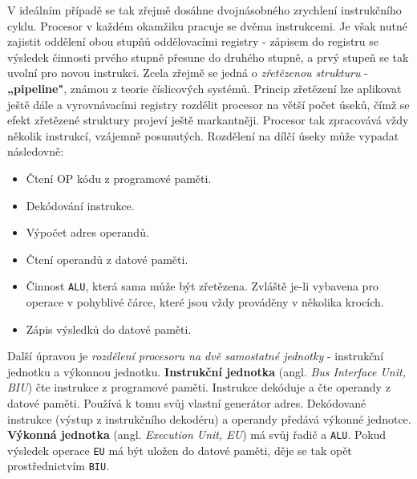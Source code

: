 
      V ideálním případě se tak zřejmě dosáhne dvojnásobného zrychlení instrukčního cyklu. Procesor 
      v každém okamžiku pracuje se dvěma instrukcemi. Je však nutné zajistit oddělení obou stupňů 
      oddělovacími registry - zápisem do registru se výsledek činnosti prvého stupně přesune do 
      druhého stupně, a prvý stupeň se tak uvolní pro novou instrukci. Zcela zřejmě se jedná o 
      \emph{zřetězenou strukturu} - \textbf{„pipeline"}, známou z teorie číslicových systémů. 
      Princip zřetězení lze aplikovat ještě dále a vyrovnávacími registry rozdělit procesor na 
      větší počet úseků, čímž se efekt zřetězené struktury projeví ještě markantněji. Procesor tak 
      zpracovává vždy několik instrukcí, vzájemně posunutých. Rozdělení na dílčí úseky může vypadat 
      následovně:
      \begin{itemize}[noitemsep]
        \item Čtení OP kódu z programové paměti.
        \item Dekódování instrukce.
        \item Výpočet adres operandů.
        \item Čtení operandů z datové paměti.
        \item Činnost \texttt{ALU}, která sama může být zřetězena. Zvláště je-li vybavena pro  
              operace v pohyblivé čárce, které jsou vždy prováděny v několika krocích.
        \item Zápis výsledků do datové paměti.
      \end{itemize}
      
      Další úpravou je \emph{rozdělení procesoru na dvě samostatné jednotky} - instrukční jednotku 
      a výkonnou jednotku. \textbf{Instrukční jednotka} (angl. \emph{Bus Interface Unit, BIU}) čte 
      instrukce z programové paměti. Instrukce dekóduje a čte operandy z datové paměti. Používá k 
      tomu svůj vlastní generátor adres. Dekódované instrukce (výstup z instrukčního dekodéru) a 
      operandy předává výkonné jednotce. \textbf{Výkonná jednotka} (angl. \emph{Execution Unit, 
      EU}) má svůj řadič a \texttt{ALU}. Pokud výsledek operace \texttt{EU} má být uložen do datové 
      paměti, děje se tak opět prostřednictvím \texttt{BIU}. 
      
